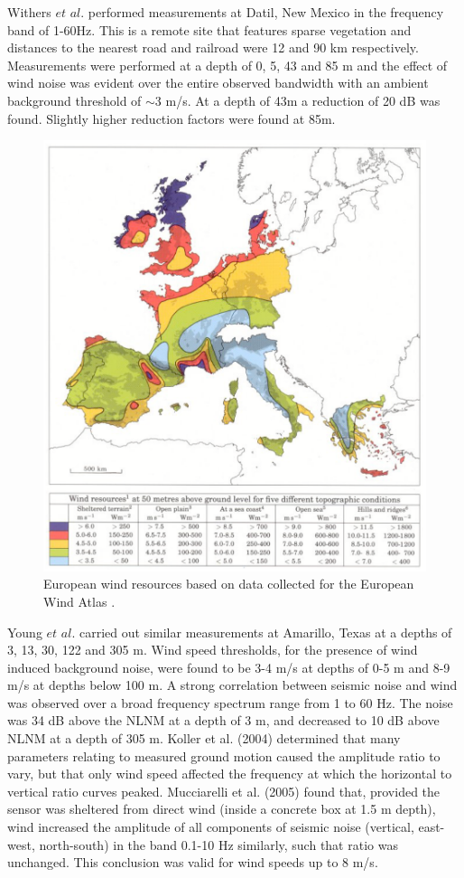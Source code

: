 Withers $et$ $al.$ \cite{Withers1996} performed measurements at Datil, New Mexico in the frequency band of 1-60Hz. This is a remote site that features sparse vegetation and distances to the nearest road and railroad were 12 and 90 km respectively. Measurements were performed at a depth of 0, 5, 43 and 85 m and the effect of wind noise was evident over the entire observed bandwidth with an ambient background threshold of $\sim$3 m/s. At a depth of 43m a reduction of 20 dB was found. Slightly higher reduction factors were found at 85m.
\begin{figure}[h!]
	\begin{center}
		\includegraphics[width=12cm]{./Sec_SiteInfra/Figures/wind.pdf}
		\caption{European wind resources based on data collected for the European Wind Atlas \cite{WindatlasWWW}.}
		\label{fig3.5}
	\end{center}
\end{figure}

Young $et$ $al.$ \cite{Young1996} carried out similar measurements at Amarillo, Texas at a depths of 3, 13, 30, 122 and 305 m. Wind speed thresholds, for the presence of wind induced background noise, were found to be 3-4 m/s at depths of 0-5 m and 8-9 m/s at depths below 100 m. A strong correlation between seismic noise and wind was observed over a broad frequency spectrum range from 1 to 60 Hz. The noise was 34 dB above the NLNM at a depth of 3 m, and decreased to 10 dB above NLNM at a depth of 305 m. Koller et al. (2004) determined that many parameters relating to measured ground motion caused the amplitude ratio to vary, but that only wind speed affected the frequency at which the horizontal to vertical ratio curves peaked. Mucciarelli et al. (2005) found that, provided the sensor was sheltered from direct wind (inside a concrete box at 1.5 m depth), wind increased the amplitude of all components of seismic noise (vertical, east-west, north-south) in the band 0.1-10 Hz similarly, such that ratio was unchanged. This conclusion was valid for wind speeds up to 8 m/s. 

